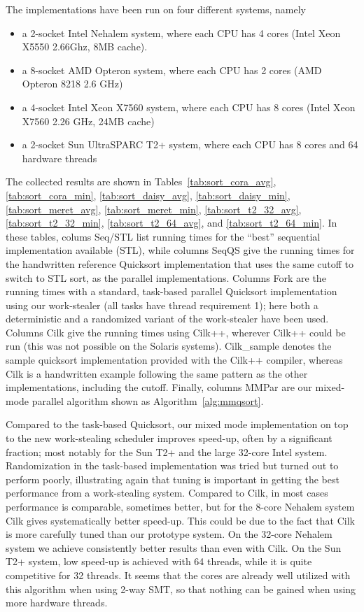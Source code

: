 \documentclass[preprint]{sigplanconf}
\begin{document}
The implementations have been run on four different systems, namely
\begin{itemize}
\item
a 2-socket Intel Nehalem system, where each CPU has 4 cores 
(Intel Xeon X5550 2.66Ghz, 8MB cache).  
\item
a 8-socket AMD Opteron system, where each CPU has 2 cores
(AMD Opteron 8218 2.6 GHz)
\item
a 4-socket Intel Xeon X7560 system, where each CPU has 8 cores
(Intel Xeon X7560 2.26 GHz, 24MB cache)
\item
a 2-socket Sun UltraSPARC T2+ system, where each CPU has 8 cores and 64 hardware threads
\end{itemize}
The collected results are shown in Tables~\ref{tab:sort_cora_avg},
\ref{tab:sort_cora_min}, \ref{tab:sort_daisy_avg},
\ref{tab:sort_daisy_min}, \ref{tab:sort_meret_avg},
\ref{tab:sort_meret_min}, \ref{tab:sort_t2_32_avg},
\ref{tab:sort_t2_32_min}, \ref{tab:sort_t2_64_avg}, and
\ref{tab:sort_t2_64_min}. In these tables, colums Seq/STL list running
times for the ``best'' sequential implementation available (STL),
while columns SeqQS give the running times for the handwritten
reference Quicksort implementation that uses the same cutoff to switch
to STL sort, as the parallel implementations.  Columns Fork are the
running times with a standard, task-based parallel Quicksort
implementation using our work-stealer (all tasks have thread
requirement 1); here both a deterministic and a randomized variant of
the work-stealer have been used.  Columns Cilk give the running times
using Cilk++, wherever Cilk++ could be run (this was not possible on the
Solaris systems). Cilk\_sample denotes the sample quicksort
implementation provided with the Cilk++ compiler, whereas Cilk is a
handwritten example following the same pattern as the other
implementations, including the cutoff. Finally, columns MMPar are our
mixed-mode parallel algorithm shown as Algorithm~\ref{alg:mmqsort}.

Compared to the task-based Quicksort, our mixed mode implementation on
top to the new work-stealing scheduler improves speed-up, often by a
significant fraction; most notably for the Sun T2+ and the large
32-core Intel system. Randomization in the task-based implementation
was tried but turned out to perform poorly, illustrating again that
tuning is important in getting the best performance from a
work-stealing system.  Compared to Cilk, in most cases performance is
comparable, sometimes better, but for the 8-core Nehalem system Cilk
gives systematically better speed-up. This could be due to the fact
that Cilk is more carefully tuned than our prototype system. On the
32-core Nehalem system we achieve consistently better results than even with
Cilk.  On the Sun T2+ system, low speed-up is achieved with 64
threads, while it is quite competitive for 32 threads.  It seems that
the cores are already well utilized with this algorithm when using
2-way SMT, so that nothing can be gained when using more hardware
threads.
\end{document}
